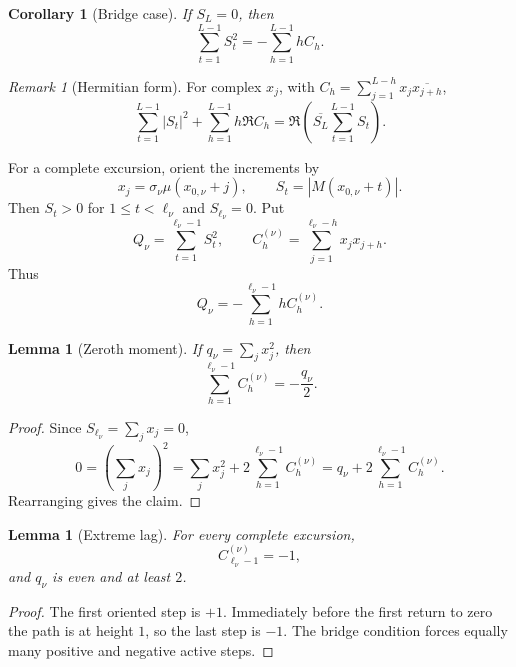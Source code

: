 \documentclass[11pt]{amsart}
\numberwithin{equation}{section}
\theoremstyle{plain}
\newtheorem{lemma}[theorem]{Lemma}
\newtheorem{corollary}[theorem]{Corollary}
\theoremstyle{definition}
\theoremstyle{remark}
\newtheorem{remark}[theorem]{Remark}
\begin{document}
\begin{corollary}[Bridge case]
\label{cor:bridge}
If $S_L=0$, then
\begin{equation}
\label{eq:bridge-triangular}
\sum_{t=1}^{L-1}S_t^2=-\sum_{h=1}^{L-1}hC_h.
\end{equation}
\end{corollary}

\begin{remark}[Hermitian form]
\label{rem:hermitian}
For complex $x_j$, with
$C_h=\sum_{j=1}^{L-h}x_j\overline{x_{j+h}}$,
\[
\sum_{t=1}^{L-1}|S_t|^2+\sum_{h=1}^{L-1}h\Re C_h
=\Re\!\left(\overline{S_L}\sum_{t=1}^{L-1}S_t\right).
\]
\end{remark}

For a complete excursion, orient the increments by
\begin{equation}
\label{eq:orientation}
x_j=\sigma_\nu\mu(x_{0,\nu}+j),\qquad
S_t=|M(x_{0,\nu}+t)|.
\end{equation}
Then $S_t>0$ for $1\le t<\ell_\nu$ and $S_{\ell_\nu}=0$. Put
\begin{equation}
\label{eq:Q_def}
Q_\nu=\sum_{t=1}^{\ell_\nu-1}S_t^2,\qquad
C_h^{(\nu)}=\sum_{j=1}^{\ell_\nu-h}x_jx_{j+h}.
\end{equation}
Thus
\begin{equation}
\label{eq:Qcorr}
Q_\nu=-\sum_{h=1}^{\ell_\nu-1}hC_h^{(\nu)}.
\end{equation}

\begin{lemma}[Zeroth moment]
\label{lem:zeroth-corr}
If $q_\nu=\sum_jx_j^2$, then
\begin{equation}
\label{eq:zeroth-corr}
\sum_{h=1}^{\ell_\nu-1}C_h^{(\nu)}=-\frac{q_\nu}{2}.
\end{equation}
\end{lemma}

\begin{proof}
Since $S_{\ell_\nu}=\sum_jx_j=0$,
\[
0=\left(\sum_jx_j\right)^2
=\sum_jx_j^2+2\sum_{h=1}^{\ell_\nu-1}C_h^{(\nu)}
=q_\nu+2\sum_{h=1}^{\ell_\nu-1}C_h^{(\nu)}.
\]
Rearranging gives the claim.
\end{proof}

\begin{lemma}[Extreme lag]
\label{lem:extreme-lag}
For every complete excursion,
\[
C_{\ell_\nu-1}^{(\nu)}=-1,
\]
and $q_\nu$ is even and at least $2$.
\end{lemma}

\begin{proof}
The first oriented step is $+1$.  Immediately before the first return to
zero the path is at height $1$, so the last step is $-1$.  The bridge
condition forces equally many positive and negative active steps.
\end{proof}
\end{document}
